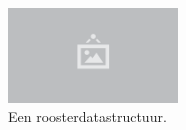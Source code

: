 \begin{figure}
  \centering
  \includegraphics[width=0.4\textwidth]{./img/raw/placeholder.png}
  \caption{Een roosterdatastructuur.}
  \label{fig:hs-datastructuur-grid}
\end{figure}
